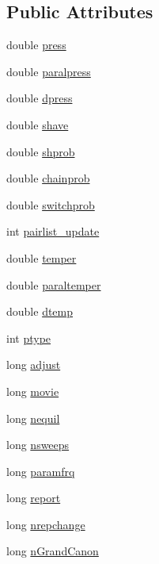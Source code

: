 \subsection*{Public Attributes}
\begin{DoxyCompactItemize}
\item 
double \hyperlink{struct_sim_a2d0641585ed0c114d119b0e0a4fbafef}{press}
\item 
double \hyperlink{struct_sim_a2206aa7350fdbc1cbf14190fe01882a7}{paralpress}
\item 
double \hyperlink{struct_sim_a3932d35b63dc24ad4f11c902e2245c16}{dpress}
\item 
double \hyperlink{struct_sim_a9357f4ec28e50a0fab9df1536c7f4d7e}{shave}
\item 
double \hyperlink{struct_sim_a65b96c98b4444057b20d47594298ccde}{shprob}
\item 
double \hyperlink{struct_sim_a711ff4e92fd436425a29d061973d188c}{chainprob}
\item 
double \hyperlink{struct_sim_a71dacb1d9da362be221fa89a27dc47bc}{switchprob}
\item 
int \hyperlink{struct_sim_aea1de81852a1210e4b32bb887bbc52e1}{pairlist\+\_\+update}
\item 
double \hyperlink{struct_sim_aa181060fddbb0694234034de7642f56a}{temper}
\item 
double \hyperlink{struct_sim_a216b84935ba38ff57f3bd3f13b2c2b20}{paraltemper}
\item 
double \hyperlink{struct_sim_a7eeac7dc978008dbcb58db25672d3e4d}{dtemp}
\item 
int \hyperlink{struct_sim_a85e257bc2ae8a9e328798ddeb776fc3f}{ptype}
\item 
long \hyperlink{struct_sim_a26476b5125d2eba8af2931d32f8cff12}{adjust}
\item 
long \hyperlink{struct_sim_a8ab1f7bc34f48d81074283f529ee291c}{movie}
\item 
long \hyperlink{struct_sim_a2bb37396aab56f270fc38442dee52fb1}{nequil}
\item 
long \hyperlink{struct_sim_a75f988cb78b30aeae402e4f63f28bfcc}{nsweeps}
\item 
long \hyperlink{struct_sim_acc700b6bf4b51dae5604a8480a8054c9}{paramfrq}
\item 
long \hyperlink{struct_sim_a7ff9e858e99db9ed0d65107f892d7447}{report}
\item 
long \hyperlink{struct_sim_a380b916e43b3eadc916f7695c9d60555}{nrepchange}
\item 
long \hyperlink{struct_sim_a5590bfd944244ebfe9b72fa43563162e}{n\+Grand\+Canon}

\end{DoxyCompactItemize}
